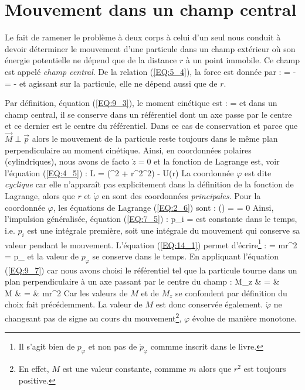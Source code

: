 \section{Mouvement dans un champ central}

Le fait de ramener le probl\`eme \`a deux corps \`a celui d'un seul nous conduit \`a devoir d\'eterminer le mouvement d'une particule dans un champ ext\'erieur o\`u son \'energie potentielle ne d\'epend que de la distance $r$ \`a un point immobile. Ce champ est appel\'e \emph{champ central}. De la relation (\ref{EQ:5_4}), la force est donn\'ee par :
\be
	 = - = -
\ee
et agissant sur la particule, elle ne d\'epend aussi que de $r$.

Par d\'efinition, \'equation (\ref{EQ:9_3}), le moment cin\'etique est :
\be
	 = \wedge{}
\ee
et dans un champ central, il se conserve dans un r\'ef\'erentiel dont un axe passe par le centre et ce dernier est le centre du r\'ef\'erentiel. Dans ce cas de conservation et parce que $\vec{M}\perp\vec{p}$ alors le mouvement de la particule reste toujours dans le m\^eme plan perpendiculaire au moment cin\'etique. Ainsi, en coordonn\'ees polaires (cylindriques), nous avons de facto $\dot{z} = 0$ et la fonction de Lagrange est, voir l'\'equation (\ref{EQ:4_5}) :
\be
	L = (^{2} + r^{2}\dot{\varphi}^{2}) - U(r) \label{EQ:14_1}
\ee
La coordonn\'ee $\varphi$ est dite \emph{cyclique} car elle n'appara\^it pas explicitement dans la d\'efinition de la fonction de Lagrange, alors que $r$ et $\dot{\varphi}$ en sont des coordonn\'ees \emph{principales}. Pour la coordonn\'ee $\varphi$, les \'equations de Lagrange (\ref{EQ:2_6}) sont :
\be
	\left(\right) =  = 0
\ee
Ainsi, l'impulsion g\'en\'eralis\'ee, \'equation (\ref{EQ:7_5}) :
\be
	p_{i} = 
\ee
est constante dans le temps, i.e. $p_{i}$ est une int\'egrale premi\`ere, soit une int\'egrale du mouvement qui conserve sa valeur pendant le mouvement. L'\'equation (\ref{EQ:14_1}) permet d'\'ecrire\footnote{Il s'agit bien de $p_{\varphi}$ et non pas de $\dot{p}_{\varphi}$ commme inscrit dans le livre.} :
\be
	 = mr^{2}\dot{\varphi} = p_{\varphi}
\ee
et la valeur de $p_{\varphi}$ se conserve dans le temps. En appliquant l'\'equation (\ref{EQ:9_7}) car nous avons choisi le r\'ef\'erentiel tel que la particule tourne dans un plan perpendiculaire \`a un axe passant par le centre du champ :
\bea
	M_{z} & = &  \nonumber \\
	\Leftrightarrow M & = & mr^{2}\dot{\varphi} \label{EQ:14_2}
\eea
Car les valeurs de $M$ et de $M_{z}$ se confondent par d\'efinition du choix fait pr\'ec\'edemment. La valeur de $M$ est donc conserv\'ee \'egalement. $\dot{\varphi}$ ne changeant pas de signe au cours du mouvement\footnote{En effet, $M$ est une valeur constante, commme $m$ alors que $r^{2}$ est toujours positive.}, $\varphi$ \'evolue de mani\`ere monotone.

